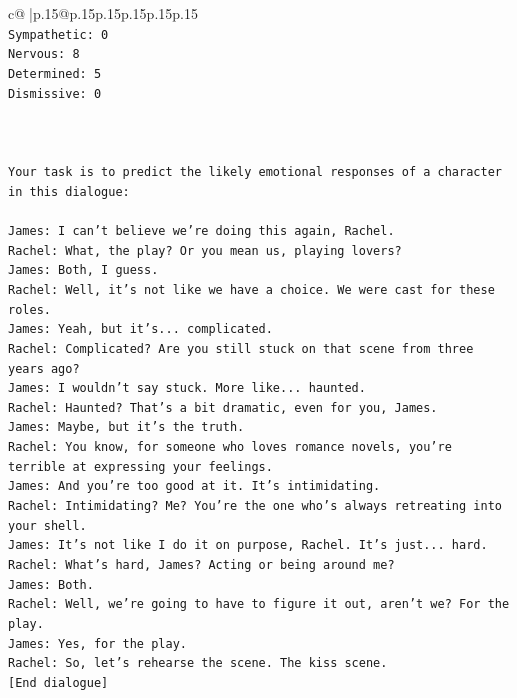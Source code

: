 \documentclass{article}
\begin{document}
{\begin{supertabular}{c@{$\;$}|p{.15\linewidth}@{}p{.15\linewidth}p{.15\linewidth}p{.15\linewidth}p{.15\linewidth}p{.15\linewidth}}
{{{\\ 
\texttt{Sympathetic: 0} \\
\texttt{Nervous: 8} \\
\texttt{Determined: 5} \\
\texttt{Dismissive: 0} \\
\\ 
\\ 
\\ 
\texttt{Your task is to predict the likely emotional responses of a character in this dialogue:} \\
\\ 
\texttt{James: I can't believe we're doing this again, Rachel. } \\
\texttt{Rachel: What, the play? Or you mean us, playing lovers?} \\
\texttt{James: Both, I guess. } \\
\texttt{Rachel: Well, it's not like we have a choice. We were cast for these roles. } \\
\texttt{James: Yeah, but it's... complicated.} \\
\texttt{Rachel: Complicated? Are you still stuck on that scene from three years ago?} \\
\texttt{James: I wouldn't say stuck. More like... haunted.} \\
\texttt{Rachel: Haunted? That's a bit dramatic, even for you, James.} \\
\texttt{James: Maybe, but it's the truth.} \\
\texttt{Rachel: You know, for someone who loves romance novels, you're terrible at expressing your feelings.} \\
\texttt{James: And you're too good at it. It's intimidating.} \\
\texttt{Rachel: Intimidating? Me? You're the one who's always retreating into your shell.} \\
\texttt{James: It's not like I do it on purpose, Rachel. It's just... hard.} \\
\texttt{Rachel: What's hard, James? Acting or being around me?} \\
\texttt{James: Both.} \\
\texttt{Rachel: Well, we're going to have to figure it out, aren't we? For the play.} \\
\texttt{James: Yes, for the play.} \\
\texttt{Rachel: So, let's rehearse the scene. The kiss scene.} \\
\texttt{{[}End dialogue{]}} \\
}}}
\end{supertabular}}
\end{document}
